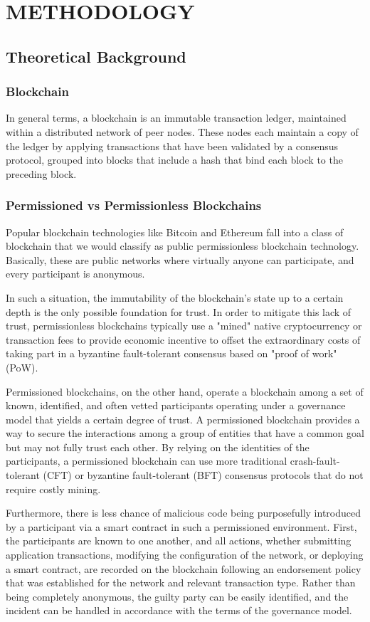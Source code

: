 \chapter{METHODOLOGY}
\section{Theoretical Background}
\subsection{Blockchain}
In general terms, a blockchain is an immutable transaction ledger, maintained within a distributed network of peer nodes. These nodes each maintain a copy of the ledger by applying transactions that have been validated by a consensus protocol, grouped into blocks that include a hash that bind each block to the preceding block.

\subsection{Permissioned vs Permissionless Blockchains}
Popular blockchain technologies like Bitcoin and Ethereum fall into a class of blockchain that we would classify as public permissionless blockchain technology. Basically, these are public networks where virtually anyone can participate, and every participant is anonymous.

In such a situation, the immutability of the blockchain's state up to a certain depth is the only possible foundation for trust. In order to mitigate this lack of trust, permissionless blockchains typically use a "mined" native cryptocurrency or transaction fees to provide economic incentive to offset the extraordinary costs of taking part in a byzantine fault-tolerant consensus based on "proof of work" (PoW).

Permissioned blockchains, on the other hand, operate a blockchain among a set of known, identified, and often vetted participants operating under a governance model that yields a certain degree of trust. A permissioned blockchain provides a way to secure the interactions among a group of entities that have a common goal but may not fully trust each other. By relying on the identities of the participants, a permissioned blockchain can use more traditional crash-fault-tolerant (CFT) or byzantine fault-tolerant (BFT) consensus protocols that do not require costly mining.

Furthermore, there is less chance of malicious code being purposefully introduced by a participant via a smart contract in such a permissioned environment. First, the participants are known to one another, and all actions, whether submitting application transactions, modifying the configuration of the network, or deploying a smart contract, are recorded on the blockchain following an endorsement policy that was established for the network and relevant transaction type. Rather than being completely anonymous, the guilty party can be easily identified, and the incident can be handled in accordance with the terms of the governance model.

